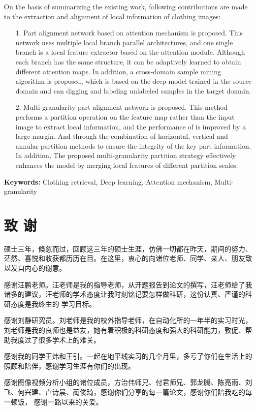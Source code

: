 \documentclass[figurelist,tablelist,nomlist,masters]{Style/seuthesix}
\begin{document}
  On the basis of summarizing the existing work, following contributions are made to the extraction and alignment of local information 
  of clothing images:
  \begin{itemize}
    \item[1.]Part alignment network based on attention mechanism is proposed. This network uses multiple local branch parallel architectures, 
      and one single branch is a local feature extractor based on the attention module. Although each branch has the same structure, it can be adaptively learned to obtain different attention maps.
      In addition, a cross-domain sample mining algorithm is proposed, which is based on the deep model trained in the source domain and can digging and labeling unlabeled samples in the target domain.
    \item[2.]Multi-granularity part alignment network is proposed. This method performs a partition operation on the feature map rather than the input image to extract local information, 
      and the performance of is improved by a large margin. And through the combination of horizontal, vertical and annular partition methods to ensure the integrity of the key part information.
      In addition, The proposed multi-granularity partition strategy effectively enhances the model by merging local features of different partition scales.
  \end{itemize}
  \vspace{3ex}
  \textbf{Keywords:} Clothing retrieval, Deep learning, Attention mechanism, Multi-granularity


\tableofcontents
\listofothers

\mainmatter
{}

%

\cleardoublepage 

\cleardoublepage 


 
\clearpage
\pagestyle{plain}
\chapter*{致 谢}
硕士三年，倏忽而过，回顾这三年的硕士生涯，仿佛一切都在昨天，期间的努力、茫然、喜悦和收获都历历在目。在这里，衷心的向诸位老师、同学、亲人、朋友致以发自内心的谢意。

感谢汪鹏老师。汪老师是我的指导老师，从开题报告到论文的撰写，汪老师给了我诸多的建议，汪老师的学术态度让我时刻铭记要怎样做科研，这份认真、严谨的科研态度是我终生的
学习目标。

感谢刘静研究员。刘老师是我的校外指导老师，在自动化所的一年半的实习时光，刘老师是我的良师也是益友，她有着积极的科研态度和强大的科研能力，敦促、帮助我度过了很多学术上的难关。

感谢我的同学王炜和王引。一起在地平线实习的几个月里，多亏了你们在生活上的照顾和陪伴，感谢学习生涯有你们的出现。

感谢图像视频分析小组的诸位成员，方治伟师兄、付君师兄、郭龙腾、陈亮雨、刘飞、何兴建、卢诗晨、蔺俊琦，感谢你们分享的每一篇论文，感谢你们陪我吃的每一顿饭，
感谢一路以来的关爱。

       
\end{document}
